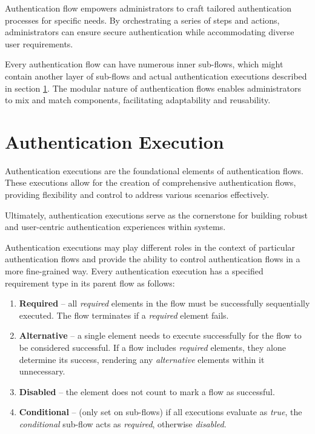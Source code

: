 Authentication flow empowers administrators to craft tailored authentication processes for specific needs.
By orchestrating a series of steps and actions, administrators can ensure secure authentication while accommodating diverse user requirements.\cite{keycloak-auth-flows}

Every authentication flow can have numerous inner sub-flows, which might contain another layer of sub-flows and actual authentication executions described in section \ref{keycloak-auth-exec}.
The modular nature of authentication flows enables administrators to mix and match components, facilitating adaptability and reusability.

\section{Authentication Execution}\label{keycloak-auth-exec}
Authentication executions are the foundational elements of authentication flows.
These executions allow for the creation of comprehensive authentication flows, providing flexibility and control to address various scenarios effectively.

Ultimately, authentication executions serve as the cornerstone for building robust and user-centric authentication experiences within systems.

Authentication executions may play different roles in the context of particular authentication flows and provide the ability to control authentication flows in a more fine-grained way. \cite{keycloak-auth-flows}
\newpage
Every authentication execution has a specified requirement type in its parent flow as follows:

\begin{enumerate}
    \item \textbf{Required} -- all \textit{required} elements in the flow must be successfully sequentially executed. The flow terminates if a \textit{required} element fails.
    \item \textbf{Alternative} -- a single element needs to execute successfully for the flow to be considered successful. If a flow includes \textit{required} elements, they alone determine its success, rendering any \textit{alternative} elements within it unnecessary.
    \item \textbf{Disabled} -- the element does not count to mark a flow as successful.
    \item \textbf{Conditional} -- (only set on sub-flows) if all executions evaluate as \textit{true}, the \textit{conditional} sub-flow acts as \textit{required}, otherwise \textit{disabled}.
\end{enumerate}

